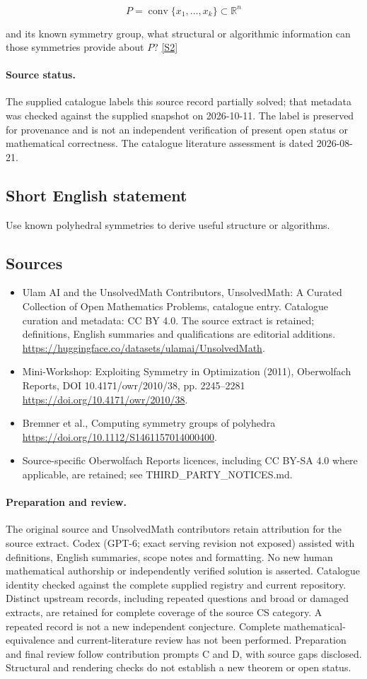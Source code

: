 \documentclass[11pt]{article}
\begin{document}
$$P=\operatorname{conv}\{x_1,\ldots,x_k\}\subset\mathbb R^n$$

and its known symmetry group, what structural or algorithmic information can those symmetries provide about $P$? \href{https://doi.org/10.4171/owr/2010/38}{[S2]}
\paragraph{Source status.}
The supplied catalogue labels this source record partially solved; that metadata was checked against the supplied snapshot on 2026-10-11. The label is preserved for provenance and is not an independent verification of present open status or mathematical correctness. The catalogue literature assessment is dated 2026-08-21.
\subsection{Short English statement}
Use known polyhedral symmetries to derive useful structure or algorithms.
\subsection{Sources}
\begin{itemize}
\item[S1] Ulam AI and the UnsolvedMath Contributors, UnsolvedMath: A Curated Collection of Open Mathematics Problems, catalogue entry. Catalogue curation and metadata: CC BY 4.0. The source extract is retained; definitions, English summaries and qualifications are editorial additions.
\url{https://huggingface.co/datasets/ulamai/UnsolvedMath}.
\item[S2] Mini-Workshop: Exploiting Symmetry in Optimization (2011), Oberwolfach Reports, DOI 10.4171/owr/2010/38, pp. 2245--2281
\url{https://doi.org/10.4171/owr/2010/38}.
\item[S3] Bremner et al., Computing symmetry groups of polyhedra
\url{https://doi.org/10.1112/S1461157014000400}.
\item Source-specific Oberwolfach Reports licences, including CC BY-SA 4.0 where applicable, are retained; see THIRD\_PARTY\_NOTICES.md.
\end{itemize}
\paragraph{Preparation and review.}
The original source and UnsolvedMath contributors retain attribution for the source extract. Codex (GPT-6; exact serving revision not exposed) assisted with definitions, English summaries, scope notes and formatting. No new human mathematical authorship or independently verified solution is asserted. Catalogue identity checked against the complete supplied registry and current repository. Distinct upstream records, including repeated questions and broad or damaged extracts, are retained for complete coverage of the source CS category. A repeated record is not a new independent conjecture. Complete mathematical-equivalence and current-literature review has not been performed. Preparation and final review follow contribution prompts C and D, with source gaps disclosed. Structural and rendering checks do not establish a new theorem or open status.
\label{end:statement}
\end{document}
